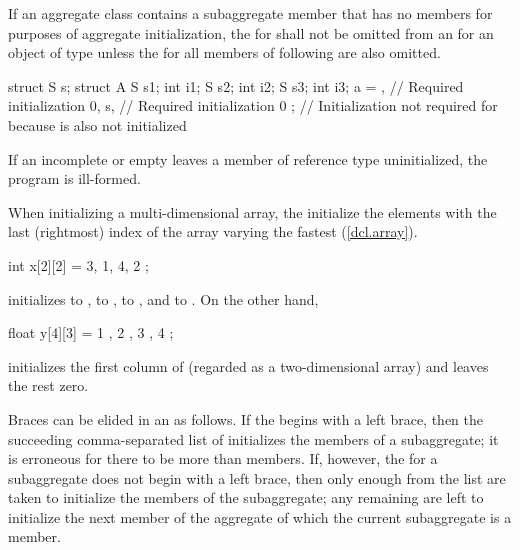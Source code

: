 \pnum
If an aggregate class  contains a subaggregate member
 that has no members for purposes of aggregate initialization,
the  for  shall not be
omitted from an  for an object of type
 unless the  for all
members of  following  are also omitted.
\enterexample

\begin{codeblock}
struct S { } s;
struct A {
  S s1;
  int i1;
  S s2;
  int i2;
  S s3;
  int i3;
} a = {
  { },      // Required initialization
  0,
  s,        // Required initialization
  0
};          // Initialization not required for  because  is also not initialized
\end{codeblock}
\exitexample

\pnum
If an incomplete or empty
leaves a member of reference type uninitialized, the program is ill-formed.

\pnum
When initializing a multi-dimensional array,
the
initialize the elements with the last (rightmost) index of the array
varying the fastest (\ref{dcl.array}).
\enterexample

\begin{codeblock}
int x[2][2] = { 3, 1, 4, 2 };
\end{codeblock}

initializes
to
,
to
,
to
,
and
to
.
On the other hand,

\begin{codeblock}
float y[4][3] = {
  { 1 }, { 2 }, { 3 }, { 4 }
};
\end{codeblock}

initializes the first column of
(regarded as a two-dimensional array)
and leaves the rest zero.
\exitexample

\pnum
Braces can be elided in an
as follows.
If the
begins with a left brace,
then the succeeding comma-separated list of
initializes the members of a subaggregate;
it is erroneous for there to be more
than members.
If, however, the
for a subaggregate does not begin with a left brace,
then only enough
from the list are taken to initialize the members of the subaggregate;
any remaining
are left to initialize the next member of the aggregate
of which the current subaggregate is a member.
\enterexample


